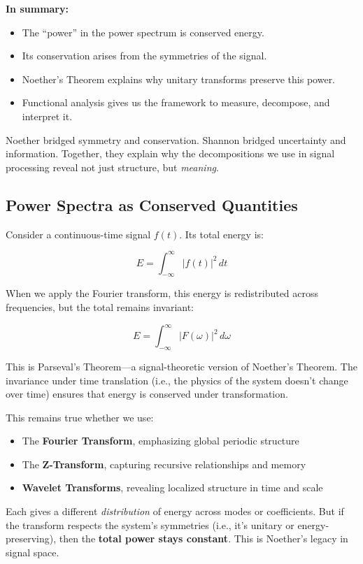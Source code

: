 \vspace{1em}
\noindent
\textbf{In summary:}

\begin{itemize}
    \item The “power” in the power spectrum is conserved energy.
    \item Its conservation arises from the symmetries of the signal.
    \item Noether’s Theorem explains why unitary transforms preserve this power.
    \item Functional analysis gives us the framework to measure, decompose, and interpret it.
\end{itemize}

Noether bridged symmetry and conservation. Shannon bridged uncertainty and information. Together, they explain why the decompositions we use in signal processing reveal not just structure, but \emph{meaning}.


\subsection{Power Spectra as Conserved Quantities}

Consider a continuous-time signal \( f(t) \). Its total energy is:

\[
E = \int_{-\infty}^{\infty} |f(t)|^2 \, dt
\]

When we apply the Fourier transform, this energy is redistributed across frequencies, but the total remains invariant:

\[
E = \int_{-\infty}^{\infty} |F(\omega)|^2 \, d\omega
\]

This is Parseval’s Theorem—a signal-theoretic version of Noether’s Theorem. The invariance under time translation (i.e., the physics of the system doesn't change over time) ensures that energy is conserved under transformation.

This remains true whether we use:
\begin{itemize}
    \item The \textbf{Fourier Transform}, emphasizing global periodic structure
    \item The \textbf{Z-Transform}, capturing recursive relationships and memory
    \item \textbf{Wavelet Transforms}, revealing localized structure in time and scale
\end{itemize}

Each gives a different \textit{distribution} of energy across modes or coefficients. But if the transform respects the system's symmetries (i.e., it's unitary or energy-preserving), then the \textbf{total power stays constant}. This is Noether's legacy in signal space.

